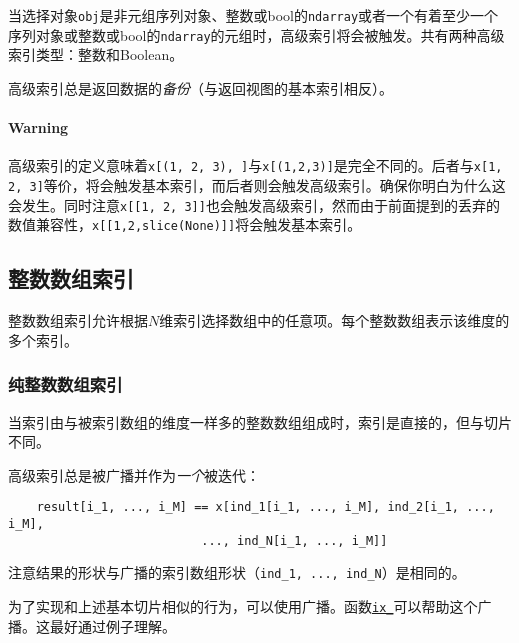 \documentclass[../main.tex]{subfile}
\begin{document}
当选择对象\lstinline{obj}是非元组序列对象、整数或bool的\lstinline{ndarray}或者一个有着至少一个序列对象或整数或bool的\lstinline{ndarray}的元组时，高级索引将会被触发。共有两种高级索引类型：整数和Boolean。

高级索引总是返回数据的\textit{备份}（与返回视图的基本索引相反）。

\paragraph{Warning}高级索引的定义意味着\lstinline{x[(1, 2, 3), ]}与\lstinline{x[(1,2,3)]}是完全不同的。后者与\lstinline{x[1, 2, 3]}等价，将会触发基本索引，而后者则会触发高级索引。确保你明白为什么这会发生。同时注意\lstinline{x[[1, 2, 3]]}也会触发高级索引，然而由于前面提到的丢弃的数值兼容性，\lstinline{x[[1,2,slice(None)]]}将会触发基本索引。

\subsection{整数数组索引}

整数数组索引允许根据$N$维索引选择数组中的任意项。每个整数数组表示该维度的多个索引。

\subsubsection{纯整数数组索引}

当索引由与被索引数组的维度一样多的整数数组组成时，索引是直接的，但与切片不同。

高级索引总是被广播并作为\textit{一个}被迭代：
\begin{lstlisting}
    result[i_1, ..., i_M] == x[ind_1[i_1, ..., i_M], ind_2[i_1, ..., i_M],
                           ..., ind_N[i_1, ..., i_M]]
\end{lstlisting}
注意结果的形状与广播的索引数组形状（\lstinline{ind_1, ..., ind_N}）是相同的。

为了实现和上述基本切片相似的行为，可以使用广播。函数\href{https://numpy.org/doc/stable/reference/generated/numpy.ix_.html#numpy.ix_}{\lstinline{ix_}}可以帮助这个广播。这最好通过例子理解。
\end{document}
